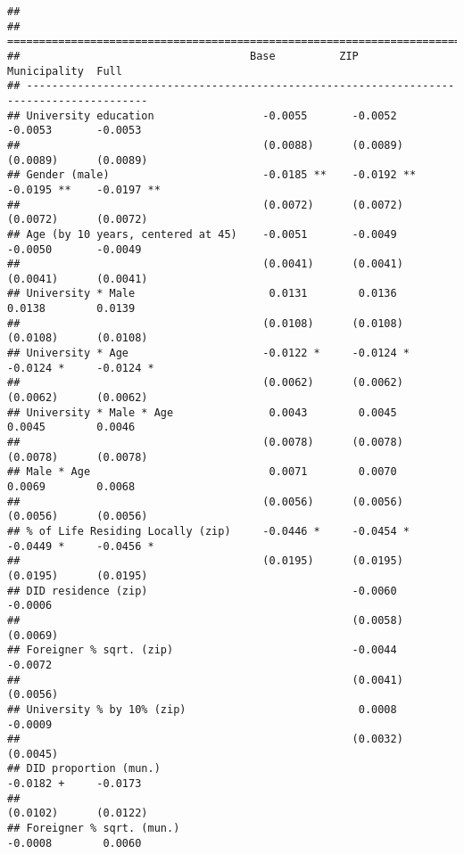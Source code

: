 \documentclass[
]{article}
\begin{document}
\begin{verbatim}
## 
## =========================================================================================
##                                    Base          ZIP           Municipality  Full        
## -----------------------------------------------------------------------------------------
## University education                 -0.0055       -0.0052       -0.0053       -0.0053   
##                                      (0.0088)      (0.0089)      (0.0089)      (0.0089)  
## Gender (male)                        -0.0185 **    -0.0192 **    -0.0195 **    -0.0197 **
##                                      (0.0072)      (0.0072)      (0.0072)      (0.0072)  
## Age (by 10 years, centered at 45)    -0.0051       -0.0049       -0.0050       -0.0049   
##                                      (0.0041)      (0.0041)      (0.0041)      (0.0041)  
## University * Male                     0.0131        0.0136        0.0138        0.0139   
##                                      (0.0108)      (0.0108)      (0.0108)      (0.0108)  
## University * Age                     -0.0122 *     -0.0124 *     -0.0124 *     -0.0124 * 
##                                      (0.0062)      (0.0062)      (0.0062)      (0.0062)  
## University * Male * Age               0.0043        0.0045        0.0045        0.0046   
##                                      (0.0078)      (0.0078)      (0.0078)      (0.0078)  
## Male * Age                            0.0071        0.0070        0.0069        0.0068   
##                                      (0.0056)      (0.0056)      (0.0056)      (0.0056)  
## % of Life Residing Locally (zip)     -0.0446 *     -0.0454 *     -0.0449 *     -0.0456 * 
##                                      (0.0195)      (0.0195)      (0.0195)      (0.0195)  
## DID residence (zip)                                -0.0060                     -0.0006   
##                                                    (0.0058)                    (0.0069)  
## Foreigner % sqrt. (zip)                            -0.0044                     -0.0072   
##                                                    (0.0041)                    (0.0056)  
## University % by 10% (zip)                           0.0008                     -0.0009   
##                                                    (0.0032)                    (0.0045)  
## DID proportion (mun.)                                            -0.0182 +     -0.0173   
##                                                                  (0.0102)      (0.0122)  
## Foreigner % sqrt. (mun.)                                         -0.0008        0.0060   

\end{verbatim}
\end{document}
